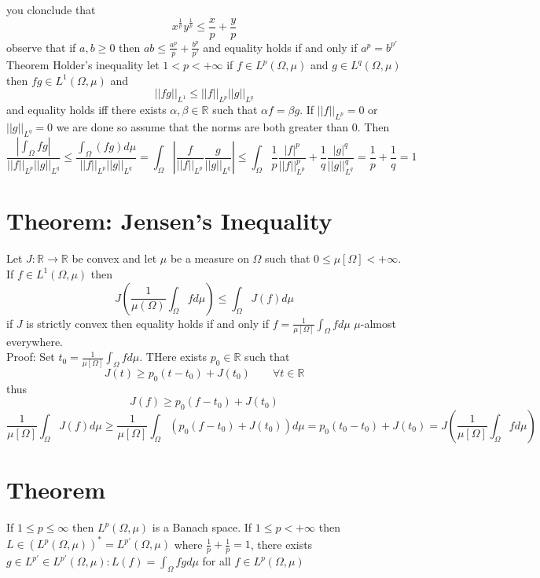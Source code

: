 \documentclass[11pt]{article}
\begin{document}
you clonclude that
\[
x^{\frac{1}{p}}y^{\frac{1}{p}} \le \frac{x}{p} + \frac{y}{p}
\] 
observe that if $a,b \ge 0$ then  $ab \le \frac{a^{p}}{p} + \frac{b^{p}}{p'}$ and equality holds if and only if $a^{p} = b^{p'}$
Theorem Holder's inequality let $1 < p < +\infty$ if $f \in L^{p}(\Omega, \mu)$ and $g \in L^{q}(\Omega, \mu)$ then $fg \in L^{1}(\Omega, \mu)$ and
\[
    ||fg||_{L^{1}} \le ||f||_{L^{p}} ||g||_{L^{q}}
\] 
and equality holds iff there exists $\alpha, \beta \in \mathbb{R}$ such that $\alpha f = \beta g$. If $||f||_{L^{p}} =0$ or $||g||_{L^{q}} = 0$ we are done so assume that 
the norms are both greater than 0. Then 
\[
    \frac{\left|\int_{\Omega}^{}fg\right|}{||f||_{L^{p}}||g||_{L^{q}}}\le \frac{\int_{\Omega}^{}(fg) d \mu}{||f||_{L^{p}} ||g||_{L^{q}}} =\int_{\Omega}^{}\left|\frac{f}{||f||_{L^{p}}} \frac{g}{||g||_{L^{q}}}\right| \le \int_{\Omega}^{}\frac{1}{p} \frac{|f|^{p}}{||f||^{p}_{L^{p}}} + \frac{1}{q} \frac{|g|^{q}}{||g||^{q}_{L^{q}}} = \frac{1}{p} + \frac{1}{q} = 1
\] 
\section{Theorem: Jensen's Inequality} Let $J: \mathbb{R} \rightarrow \mathbb{R}$ be convex and let $\mu$ be a measure on $\Omega$
such that  $0 \le \mu[\Omega] < +\infty$. If $f \in L^{1}(\Omega, \mu)$ then
\[
J(\frac{1}{\mu(\Omega)}\int_{\Omega}^{}f d \mu) \le \int_{\Omega}^{} J(f) d \mu 
\] 
if $J$ is strictly convex then equality holds if and only if  $f = \frac{1}{\mu[\Omega]}\int_{\Omega}^{}f d \mu$ $\mu$-almost everywhere.\\
Proof: Set $t_0 = \frac{1}{\mu[\Omega]} \int_{ \Omega}^{}f d \mu$. THere exists $p_0 \in \mathbb{R}$ such that
\[
J(t) \ge p_0(t-t_0) + J(t_0) \qquad \forall t \in \mathbb{R}
\] 
thus
\[
J(f) \ge p_0(f - t_0) + J(t_0)
\] 
\[
    \frac{1}{\mu[\Omega]} \int_{\Omega}^{} J(f) d \mu \ge \frac{1}{\mu[\Omega]}\int_{\Omega}^{}(p_0 (f - t_0) + J(t_0)) d \mu = p_0(t_0-t_0) + J(t_0) = J( \frac{1}{\mu[\Omega] } \int_{\Omega}^{}f d \mu)
\] 
\section{Theorem}
If $1 \le p \le \infty$ then $L^{p}(\Omega, \mu)$ is a Banach space.
If $1 \le p < +\infty$ then $L \in (L^{p}(\Omega, \mu))^{*} = L^{p'}(\Omega, \mu)$ where $\frac{1}{p} + \frac{1}{p} = 1$, there exists $g \in L^{p'} \in L^{p'}(\Omega, \mu) : L(f) = \int_{\Omega}^{}fg d \mu$ for all $f \in L^{p}(\Omega, \mu)$
\end{document}
